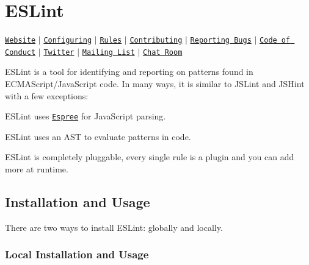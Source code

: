 \href{https://www.npmjs.com/package/eslint}{\tt } \href{https://travis-ci.org/eslint/eslint}{\tt } \href{https://ci.appveyor.com/project/nzakas/eslint/branch/master}{\tt } \href{https://coveralls.io/r/eslint/eslint?branch=master}{\tt } \href{https://www.npmjs.com/package/eslint}{\tt } \href{https://www.bountysource.com/trackers/282608-eslint?utm_source=282608&utm_medium=shield&utm_campaign=TRACKER_BADGE}{\tt } \href{https://gitter.im/eslint/eslint?utm_source=badge&utm_medium=badge&utm_campaign=pr-badge&utm_content=badge}{\tt }

\section*{E\+S\+Lint}

\href{http://eslint.org}{\tt Website} $\vert$ \href{http://eslint.org/docs/user-guide/configuring}{\tt Configuring} $\vert$ \href{http://eslint.org/docs/rules/}{\tt Rules} $\vert$ \href{http://eslint.org/docs/developer-guide/contributing}{\tt Contributing} $\vert$ \href{http://eslint.org/docs/developer-guide/contributing/reporting-bugs}{\tt Reporting Bugs} $\vert$ \href{https://js.foundation/conduct/}{\tt Code of Conduct} $\vert$ \href{https://twitter.com/geteslint}{\tt Twitter} $\vert$ \href{https://groups.google.com/group/eslint}{\tt Mailing List} $\vert$ \href{https://gitter.im/eslint/eslint}{\tt Chat Room}

E\+S\+Lint is a tool for identifying and reporting on patterns found in E\+C\+M\+A\+Script/\+Java\+Script code. In many ways, it is similar to J\+S\+Lint and J\+S\+Hint with a few exceptions\+:


\begin{DoxyItemize}
\item E\+S\+Lint uses \href{https://github.com/eslint/espree}{\tt Espree} for Java\+Script parsing.
\item E\+S\+Lint uses an A\+ST to evaluate patterns in code.
\item E\+S\+Lint is completely pluggable, every single rule is a plugin and you can add more at runtime.
\end{DoxyItemize}

\subsection*{Installation and Usage}

There are two ways to install E\+S\+Lint\+: globally and locally.

\subsubsection*{Local Installation and Usage}

